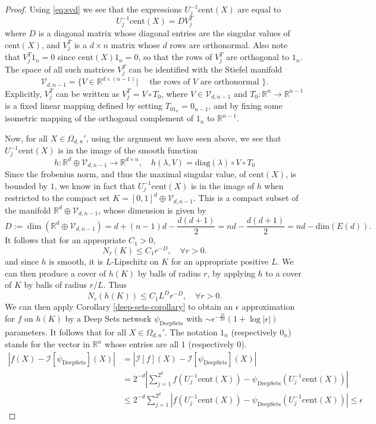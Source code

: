 \documentclass[twoside,11pt]{article}
\newcommand{\RR}{\mathbb{R}}
\newcommand{\cent}{\mathrm{cent}}
\begin{document}
\begin{proof}
Using \eqref{eq:svd} we see that the expressions $U_j^{-1}\cent(X) $  are equal to 
$$ U_j^{-1}\cent(X) =DV_j^T$$
where $D$ is a diagonal matrix whose diagonal entries are the singular values of $\cent(X) $, and $V_j^T$ is a $d\times n $ matrix whose $d$ rows are orthonormal. Also note that $V_j^T1_n=0 $ since $\cent(X)1_n=0 $, so that the rows of $V_j^T$ are orthogonal to $1_n$. The space of all such matrices $V_j^T$ can be identified with the Stiefel manifold 
$$\mathcal{V}_{d,n-1}=\{V\in \RR^{d\times (n-1)}| \quad \text{ the rows of } V \text{ are orthonormal }\}. $$
Explicitly,  $V_j^T$ can be written as $V_j^T= V\circ T_0$, where $V\in \mathcal{V}_{d,n-1} $ and $T_0:\RR^n\to \RR^{n-1} $ is a fixed linear mapping defined by setting $T_01_n=0_{n-1}$, and by fixing some isometric mapping of the orthogonal complement of $1_n$  to $\RR^{n-1} $. 

Now, for all $X\in \Omega_{d,n}'$, using the argument we have seen above, we see that $U_j^{-1}\cent(X) $ is in the image of the smooth function 
$$h:\RR^d \oplus \mathcal{V}_{d,n-1} \to \RR^{d\times n}, \quad h(\lambda,V)=\mathrm{diag}(\lambda)\circ V \circ T_0  $$
Since the frobenius norm, and thus the maximal singular value, of $\cent(X) $, is bounded by $1$, we know in fact that $U_j^{-1}\cent(X) $ is in the image of $h$ when restricted to the compact set $K=[0,1]^d \oplus \mathcal{V}_{d,n-1}  $. This is a compact subset of the manifold  $\RR^d \oplus \mathcal{V}_{d,n-1} $, whose dimension is given by 
$$D:=\dim\left(\RR^d \oplus \mathcal{V}_{d,n-1} \right)=d+(n-1)d-\frac{d(d+1)}{2}=nd-\frac{d(d+1)}{2}=nd-\mathrm{dim}(E(d)). $$
It follows that for an appropriate $C_1>0 $,
$$N_r(K)\leq C_1r^{-D}, \quad \forall r>0. $$
and since $h$ is smooth, it is $L$-Lipschitz on $K$ for an appropriate positive $L$. We can then produce a cover of $h(K)$ by balls of radius $r$, by applying $h$ to a cover of $K$ by balls of radius $r/L $. Thus 
$$N_r(h(K))\leq C_1L^Dr^{-D}, \quad \forall r>0. $$
We can then apply Corollary \ref{deep-sets-corollary} to obtain an $\epsilon$ approximation for $f$ on $h(K) $ by a Deep Sets network $\psi_{\mathrm{Deep Sets}} $ with $\sim \epsilon^{-\frac{D}{2\alpha}}(1+\log|\epsilon|)$ parameters. It follows that for all $X\in \Omega_{d,n}'$. The notation $1_n$ (respectively $0_n$) stands for the vector in $\RR^n$ whose entries are all $1$ (respectively $0$). 
\begin{align*}
|f(X)-\mathcal{I}[\psi_{\mathrm{Deep Sets}} ](X)|&=|\mathcal{I}[f](X)-\mathcal{I}[\psi_{\mathrm{Deep Sets}} ](X)|\\
&=2^{-d}|\sum_{j=1}^{2^d} f(U_j^{-1}\cent(X))-\psi_{\mathrm{Deep Sets}}(U_j^{-1}\cent(X))|\\
&\leq 2^{-d}\sum_{j=1}^{2^d} |f(U_j^{-1}\cent(X))-\psi_{\mathrm{Deep Sets}}(U_j^{-1}\cent(X))|\leq \epsilon
\end{align*}
\end{proof}
\end{document}
